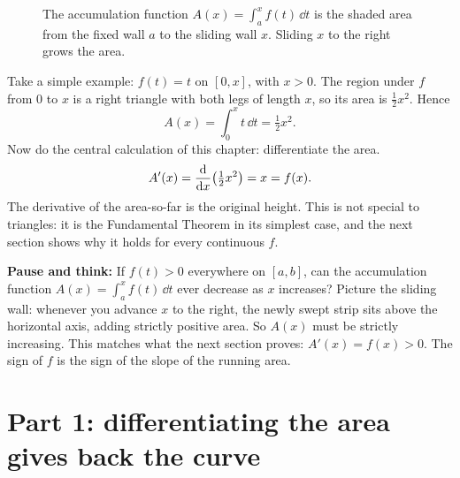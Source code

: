 \begin{figure}[H]
\centering
{}
\caption{The accumulation function $A(x)=\int_a^x f(t)\,\dd t$ is the shaded area
from the fixed wall $a$ to the sliding wall $x$. Sliding $x$ to the right grows
the area.}
\label{ch21:fig-accum}
\end{figure}

\begin{labbox}
Take a simple example: $f(t)=t$ on $[0,x]$, with $x>0$. The region under
$f$ from $0$ to $x$ is a right triangle with both legs of length $x$, so its
area is $\tfrac12 x^2$. Hence
\[
  A(x) = \int_0^x t\,\dd t = \tfrac12 x^2 .
\]
Now do the central calculation of this chapter: differentiate the area.
\[
  A'(x) = \frac{\mathrm{d}}{\mathrm{d} x}\!\left(\tfrac12 x^2\right) = x = f(x).
\]
The derivative of the area-so-far is the original height. This is not special to
triangles: it is the Fundamental Theorem in its simplest case, and the next
section shows why it holds for every continuous $f$.
\end{labbox}

\begin{recoverybox}
\textbf{Pause and think:} If $f(t) > 0$ everywhere on $[a,b]$, can the
accumulation function $A(x)=\int_a^x f(t)\,\dd t$ ever decrease as $x$ increases?
Picture the sliding wall: whenever you advance $x$ to the right, the newly swept
strip sits above the horizontal axis, adding strictly positive area. So $A(x)$
must be strictly increasing. This matches what the next section proves:
$A'(x) = f(x) > 0$. The sign of $f$ is the sign of the slope of the running area.
\end{recoverybox}

\section{Part 1: differentiating the area gives back the curve}

